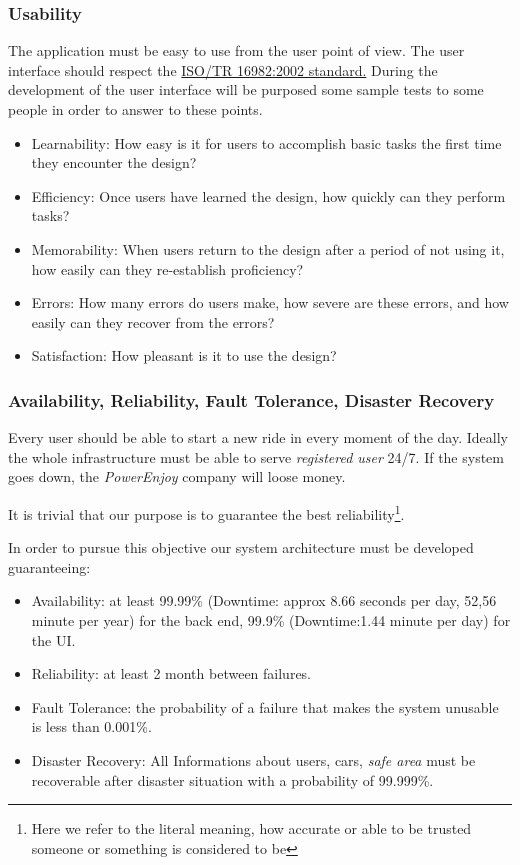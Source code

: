\documentclass[english]{article}
\newcommand{\powerenjoy}{\textit{PowerEnjoy }}
\newcommand{\registereduser}{\textit {registered user }}
\newcommand{\safearea}{\textit{safe area }}
\begin{document}
		\subsubsection{Usability}
		The application must be easy to use from the user point of view. The user interface should respect the \href{https://www.iso.org/obp/ui/#iso:std:iso:tr:16982:ed-1:v1:en}{ISO/TR 16982:2002 standard.} 
During the development of the user interface will be purposed some sample tests to some people in order to answer to these points.
	\begin{itemize}
		\item Learnability: How easy is it for users to accomplish basic tasks the first time they encounter the design?
		\item Efficiency: Once users have learned the design, how quickly can they perform tasks?
		\item Memorability: When users return to the design after a period of not using it, how easily can they re-establish proficiency?
		\item Errors: How many errors do users make, how severe are these errors, and how easily can they recover from the errors?
		\item Satisfaction: How pleasant is it to use the design?
	\end{itemize}
		\subsubsection{Availability, Reliability, Fault Tolerance, Disaster Recovery}
		Every user should be able to start a new ride in every moment of the day. Ideally the whole  infrastructure must be able to serve \registereduser 24/7. If the system goes down, the \powerenjoy company will loose money. \par It is trivial that our purpose is to guarantee the best reliability\footnote{Here we refer to the literal meaning, how accurate or able to be trusted someone or something is considered to be}.\par In order to pursue this objective our system architecture must be developed guaranteeing:
		\begin{itemize}
			\item Availability: at least 99.99\% (Downtime: approx 8.66 seconds per day, 52,56 minute per year) for the back end, 99.9\% (Downtime:1.44 minute per day) for the UI.
			\item Reliability: at least 2 month between failures.
			\item Fault Tolerance: the probability of a failure that makes the system unusable is less than 0.001\%.
			\item Disaster Recovery: All Informations about users, cars, \safearea must be recoverable after disaster situation with a probability of 99.999\%.
		\end{itemize}
\end{document}
